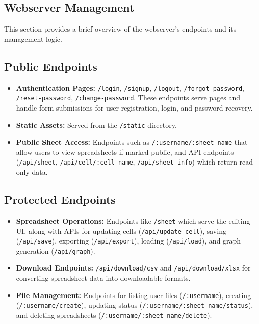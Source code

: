 \documentclass[10pt,a4paper]{article}  %
\begin{document}
\begin{enumerate}
\section{Webserver Management}

This section provides a brief overview of the webserver's endpoints and its management logic.

\subsection{Public Endpoints}
\begin{itemize}
    \item \textbf{Authentication Pages:} \texttt{/login}, \texttt{/signup}, \texttt{/logout}, \texttt{/forgot-password}, \texttt{/reset-password}, \texttt{/change-password}. These endpoints serve pages and handle form submissions for user registration, login, and password recovery.
    \item \textbf{Static Assets:} Served from the \texttt{/static} directory.
    \item \textbf{Public Sheet Access:} Endpoints such as \texttt{/:username/:sheet\_name} that allow users to view spreadsheets if marked public, and API endpoints (\texttt{/api/sheet}, \texttt{/api/cell/:cell\_name}, \texttt{/api/sheet\_info}) which return read-only data.
\end{itemize}

\subsection{Protected Endpoints}
\begin{itemize}
    \item \textbf{Spreadsheet Operations:} Endpoints like \texttt{/sheet} which serve the editing UI, along with APIs for updating cells (\texttt{/api/update\_cell}), saving (\texttt{/api/save}), exporting (\texttt{/api/export}), loading (\texttt{/api/load}), and graph generation (\texttt{/api/graph}).
    \item \textbf{Download Endpoints:} \texttt{/api/download/csv} and \texttt{/api/download/xlsx} for converting spreadsheet data into downloadable formats.
    \item \textbf{File Management:} Endpoints for listing user files (\texttt{/:username}), creating (\texttt{/:username/create}), updating status (\texttt{/:username/:sheet\_name/status}), 
    and deleting spreadsheets \newline(\texttt{/:username/:sheet\_name/delete}).
\end{itemize}


\end{enumerate}
\end{document}
